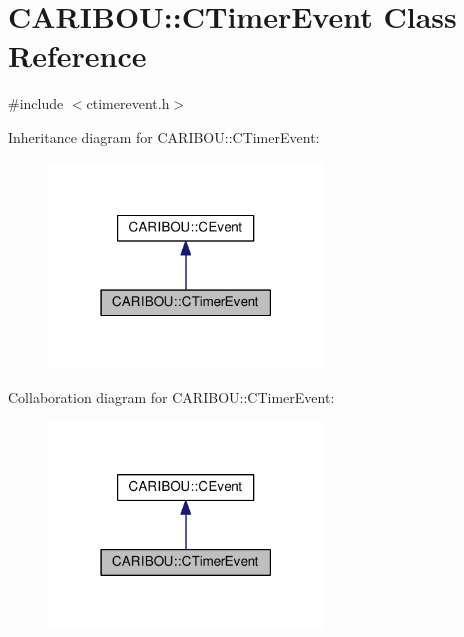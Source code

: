 \section{C\+A\+R\+I\+B\+OU\+:\+:C\+Timer\+Event Class Reference}
\label{class_c_a_r_i_b_o_u_1_1_c_timer_event}


{\ttfamily \#include $<$ctimerevent.\+h$>$}



Inheritance diagram for C\+A\+R\+I\+B\+OU\+:\+:C\+Timer\+Event\+:
\nopagebreak
\begin{figure}[H]
\begin{center}
\leavevmode
\includegraphics[width=207pt]{class_c_a_r_i_b_o_u_1_1_c_timer_event__inherit__graph}
\end{center}
\end{figure}


Collaboration diagram for C\+A\+R\+I\+B\+OU\+:\+:C\+Timer\+Event\+:
\nopagebreak
\begin{figure}[H]
\begin{center}
\leavevmode
\includegraphics[width=207pt]{class_c_a_r_i_b_o_u_1_1_c_timer_event__coll__graph}
\end{center}
\end{figure}
